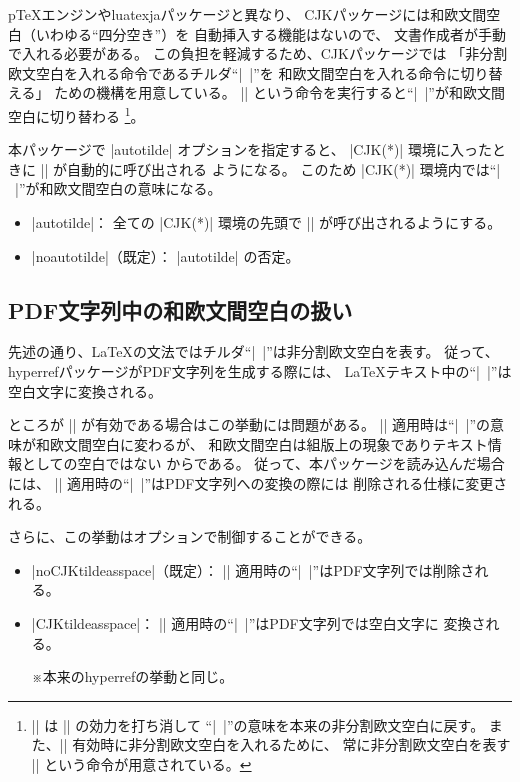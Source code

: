 \documentclass[a4paper]{ltjsarticle}
\newcommand{\Pkg}[1]{\textsf{#1}}
\newcommand{\Note}{\par\noindent ※}
\newcommand{\Means}{：\quad}
\providecommand{\pTeX}{p\TeX}
\begin{document}
{\pTeX}エンジンや\Pkg{luatexja}パッケージと異なり、
\Pkg{CJK}パッケージには和欧文間空白（いわゆる“四分空き”）を
自動挿入する機能はないので、
文書作成者が手動で入れる必要がある。
この負担を軽減するため、\Pkg{CJK}パッケージでは
「非分割欧文空白を入れる命令であるチルダ“|~|”を
和欧文間空白を入れる命令に切り替える」
ための機構を用意している。
|\CJKtilde| という命令を実行すると“|~|”が和欧文間空白に切り替わる%
\footnote{|\standardtilde| は |\CJKtilde| の効力を打ち消して
“|~|”の意味を本来の非分割欧文空白に戻す。
また、|\CJKtilde| 有効時に非分割欧文空白を入れるために、
常に非分割欧文空白を表す |\nbs| という命令が用意されている。}。

本パッケージで |autotilde| オプションを指定すると、
|CJK(*)| 環境に入ったときに |\CJKtilde| が自動的に呼び出される
ようになる。
このため |CJK(*)| 環境内では“|~|”が和欧文間空白の意味になる。

\begin{itemize}
\item |autotilde|\Means
  全ての |CJK(*)| 環境の先頭で |\autotilde| が呼び出されるようにする。
\item |noautotilde|（既定）\Means
  |autotilde| の否定。
\end{itemize}

\subsection{PDF文字列中の和欧文間空白の扱い}

先述の通り、{\LaTeX}の文法ではチルダ“|~|”は非分割欧文空白を表す。
従って、\Pkg{hyperref}パッケージがPDF文字列を生成する際には、
{\LaTeX}テキスト中の“|~|”は空白文字に変換される。

ところが |\CJKtilde| が有効である場合はこの挙動には問題がある。
|\CJKtilde| 適用時は“|~|”の意味が和欧文間空白に変わるが、
和欧文間空白は組版上の現象でありテキスト情報としての空白ではない
からである。
従って、本パッケージを読み込んだ場合には、
|\CJKtilde| 適用時の“|~|”はPDF文字列への変換の際には
削除される仕様に変更される。

さらに、この挙動はオプションで制御することができる。

\begin{itemize}
\item |noCJKtildeasspace|（既定）\Means
  |\CJKtilde| 適用時の“|~|”はPDF文字列では削除される。
\item |CJKtildeasspace|\Means
  |\CJKtilde| 適用時の“|~|”はPDF文字列では空白文字に
  変換される。
  \Note 本来の\Pkg{hyperref}の挙動と同じ。
\end{itemize}
\end{document}
